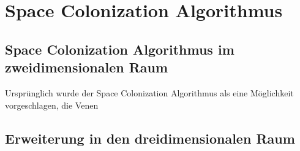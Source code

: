 \chapter{Space Colonization Algorithmus}

\section{Space Colonization Algorithmus im zweidimensionalen Raum}

Ursprünglich wurde der Space Colonization Algorithmus als eine Möglichkeit vorgeschlagen, die Venen


\section{Erweiterung in den dreidimensionalen Raum}

